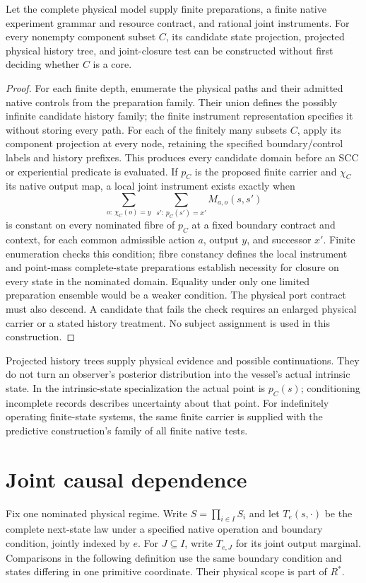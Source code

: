 \begin{proposition}
\label{prop:spc2-candidates-first}
Let the complete physical model supply finite preparations, a finite
native experiment grammar and resource contract, and rational joint
instruments. For every nonempty component subset $C$, its candidate
state projection, projected physical history tree, and joint-closure
test can be constructed without first deciding whether $C$ is a core.
\end{proposition}
\begin{proof}
For each finite depth, enumerate the physical paths and their admitted native
controls from the preparation family. Their union defines the possibly infinite candidate history family; the finite instrument representation specifies it without storing every path. For each of the finitely many
subsets $C$, apply its component projection at every node, retaining
the specified boundary/control labels and history prefixes. This
produces every candidate domain before an SCC or experiential predicate
is evaluated. If $p_C$ is the proposed finite carrier and $\chi_C$ its
native output map, a local joint instrument exists exactly when
\[
\sum_{o:\,\chi_C(o)=y}\ \sum_{s':\,p_C(s')=x'}
       M_{a,o}(s,s')
\]
is constant on every nominated fibre of $p_C$ at a fixed boundary contract and context, for each common
admissible action $a$, output $y$, and successor $x'$. Finite enumeration
checks this condition; fibre constancy defines the local instrument
and point-mass complete-state preparations establish necessity for closure on every state in the nominated domain. Equality under only one limited preparation ensemble would be a weaker condition. The physical port
contract must also descend. A candidate that fails the check requires
an enlarged physical carrier or a stated history treatment. No subject
assignment is used in this construction.
\end{proof}

Projected history trees supply physical evidence and possible
continuations. They do not turn an observer's posterior distribution
into the vessel's actual intrinsic state. In the intrinsic-state
specialization the actual point is $p_C(s)$; conditioning incomplete
records describes uncertainty about that point. For indefinitely
operating finite-state systems, the same finite carrier is supplied
with the predictive construction's family of all finite native tests.

\section{Joint causal dependence}
\label{sec:spc2-joint-dependence}
Fix one nominated physical regime. Write
$S=\prod_{i\in I}S_i$ and let $T_e(s,\cdot)$ be the complete next-state
law under a specified native operation and boundary condition, jointly indexed by $e$. For $J\subseteq I$,
write $T_{e,J}$ for its joint output marginal. Comparisons in the following
definition use the same boundary condition and states differing in one
primitive coordinate. Their physical scope is part of $R^\ast$.

